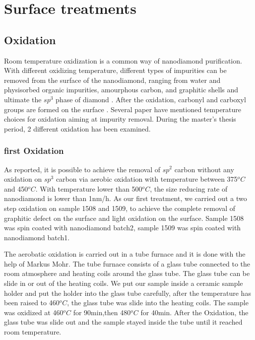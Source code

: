 
\chapter{Surface treatments} %

\label{Chapter2.5} %



\section{Oxidation}
Room temperature oxidization is a common way of nanodiamond purification. With different oxidizing temperature, different types of impurities can be removed from the surface of the nanodiamond, ranging from water and physisorbed organic impurities, amourphous carbon, and graphitic shells and ultimate the $sp^{3}$ phase of diamond \citep{t._gaebel_size-reduction_2012}. After the oxidation, carbonyl and carboxyl groups are formed on the surface \citep{wolcott_surface_2014}. Several paper have mentioned temperature choices for oxidation aiming at impurity removal.\citep{osswald_control_2006,wolcott_surface_2014,t._gaebel_size-reduction_2012} During the master's thesis period, 2 different oxidation has been examined.

\subsection[first Oxidation]{first Oxidation}
As reported, it is possible to achieve the removal of $sp^{2}$ carbon without any oxidation on $sp^{3}$ carbon via aerobic oxidation with temperature between 375$^{o}C$ and 450$^{o}C$. \cite{osswald_control_2006} With temperature lower than 500$^{o}C$, the size reducing rate of nanodiamond is lower than 1nm/h. \citep{t._gaebel_size-reduction_2012} As our first treatment, we carried out a two step oxidation on sample 1508 and 1509, to achieve the complete removal of graphitic defect on the surface and light oxidation on the surface. Sample 1508 was spin coated with nanodiamond batch2, sample 1509 was spin coated with nanodiamond batch1.

The aerobatic oxidation is carried out in a tube furnace and it is done with the help of Markus Mohr. The tube furnace consists of a glass tube connected to the room atmosphere and heating coils around the glass tube. The glass tube can be slide in or out of the heating coils. We put our sample inside a ceramic sample holder and put the holder into the glass tube carefully, after the temperature has been raised to 460$^{o}C$, the glass tube was slide into the heating coils. The sample was oxidized at 460$^{o}C$ for 90min,then 480$^{o}C$ for 40min.\citep{neu_low_2013} After the Oxidation, the glass tube was slide out and the sample stayed inside the tube until it reached room temperature.

